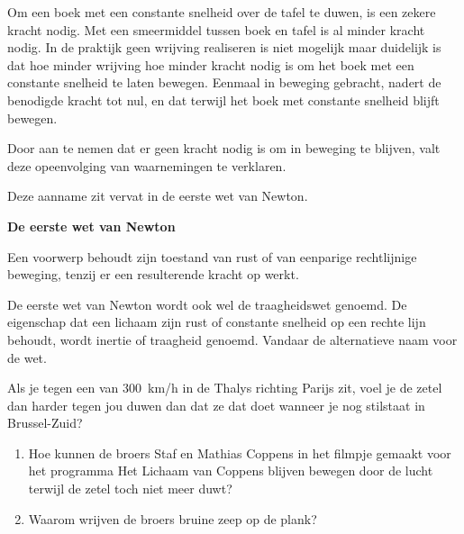 \documentclass{ximera}
\begin{document}
	\author{Bart Lambregs}
    \xmsource\xmuitleg
	
Om een boek met een constante snelheid over de tafel te duwen, is een zekere kracht nodig. Met een smeermiddel tussen boek en tafel is al minder kracht nodig. In de praktijk geen wrijving realiseren is niet mogelijk maar duidelijk is dat hoe minder wrijving hoe minder kracht nodig is om het boek met een constante snelheid te laten bewegen. Eenmaal in beweging gebracht, nadert de benodigde kracht tot nul, en dat terwijl het boek met constante snelheid blijft bewegen.

Door aan te nemen dat er geen kracht nodig is om in beweging te blijven, valt deze opeenvolging van waarnemingen te verklaren.

Deze aanname zit vervat in de eerste wet van Newton.

\begin{definition}
{\textbf{De eerste wet van Newton}}\nl

Een voorwerp behoudt zijn toestand van rust of van eenparige rechtlijnige beweging, tenzij er een resulterende kracht op werkt.
\end{definition}

\begin{remark}{De eerste wet van Newton wordt ook wel de traagheidswet genoemd.}
	De eigenschap dat een lichaam zijn rust of constante snelheid op een rechte lijn behoudt, wordt inertie of traagheid genoemd. Vandaar de alternatieve naam voor de wet.
\end{remark}

\begin{denkvraag*}{}
	Als je tegen een van \SI{300}{km/h} in de Thalys richting Parijs zit, voel je de zetel dan harder tegen jou duwen dan dat ze dat doet wanneer je nog stilstaat in Brussel-Zuid?
\end{denkvraag*}

\begin{denkvraag*}{}
	\begin{enumerate}
		\item Hoe kunnen de broers Staf en Mathias Coppens in het filmpje gemaakt voor het programma Het Lichaam van Coppens blijven bewegen door de lucht terwijl de zetel toch niet meer duwt?
		\item Waarom wrijven de broers bruine zeep op de plank?
	\end{enumerate}

	\begin{center}
	\end{center}

\end{denkvraag*}
\end{document}
